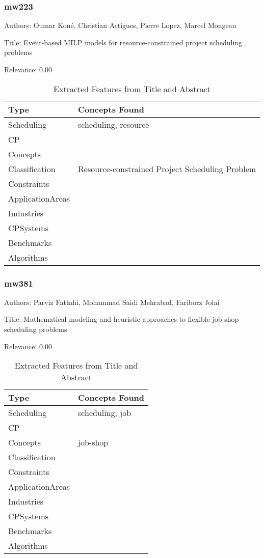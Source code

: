 \subsubsection{mw223}
\label{mw:mw223}

Authors: Oumar Koné, Christian Artigues, Pierre Lopez, Marcel Mongeau

Title: Event-based MILP models for resource-constrained project scheduling problems

Relevance:  0.00

{\scriptsize
\begin{longtable}{p{2cm}p{20cm}}
\caption{Extracted Features from Title and Abstract}\\ \toprule
Type & Concepts Found\\ \midrule
\endhead
\bottomrule
\endfoot
Scheduling & scheduling, resource\\ 
CP & \\ 
Concepts & \\ 
Classification & Resource-constrained Project Scheduling Problem\\ 
Constraints & \\ 
ApplicationAreas & \\ 
Industries & \\ 
CPSystems & \\ 
Benchmarks & \\ 
Algorithms & \\ 
\end{longtable}
}



\subsubsection{mw381}
\label{mw:mw381}

Authors: Parviz Fattahi, Mohammad Saidi Mehrabad, Fariborz Jolai

Title: Mathematical modeling and heuristic approaches to flexible job shop scheduling problems

Relevance:  0.00

{\scriptsize
\begin{longtable}{p{2cm}p{20cm}}
\caption{Extracted Features from Title and Abstract}\\ \toprule
Type & Concepts Found\\ \midrule
\endhead
\bottomrule
\endfoot
Scheduling & scheduling, job\\ 
CP & \\ 
Concepts & job-shop\\ 
Classification & \\ 
Constraints & \\ 
ApplicationAreas & \\ 
Industries & \\ 
CPSystems & \\ 
Benchmarks & \\ 
Algorithms & \\ 
\end{longtable}
}




